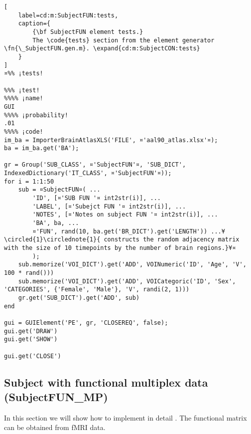 \documentclass{tufte-handout}
\begin{document}
\clearpage
\begin{lstlisting}[
	label=cd:m:SubjectFUN:tests,
	caption={
		{\bf SubjectFUN element tests.}
		The \code{tests} section from the element generator \fn{\_SubjectFUN.gen.m}. \expand{cd:m:SubjectCON:tests}
	}
]
¤%% ¡tests!

%%% ¡test!
%%%% ¡name!
GUI
%%%% ¡probability!
.01
%%%% ¡code!
im_ba = ImporterBrainAtlasXLS('FILE', ¤'aal90_atlas.xlsx'¤);
ba = im_ba.get('BA');

gr = Group('SUB_CLASS', ¤'SubjectFUN'¤, 'SUB_DICT', IndexedDictionary('IT_CLASS', ¤'SubjectFUN'¤));
for i = 1:1:50
    sub = ¤SubjectFUN¤( ...
        'ID', [¤'SUB FUN '¤ int2str(i)], ...
        'LABEL', [¤'Subejct FUN '¤ int2str(i)], ...
        'NOTES', [¤'Notes on subject FUN '¤ int2str(i)], ...
        'BA', ba, ...
        ¤'FUN', rand(10, ba.get('BR_DICT').get('LENGTH')) ...¥\circled{1}\circlednote{1}{ constructs the random adjacency matrix with the size of 10 timepoints by the number of brain regions.}¥¤
        );
    sub.memorize('VOI_DICT').get('ADD', VOINumeric('ID', 'Age', 'V', 100 * rand()))
    sub.memorize('VOI_DICT').get('ADD', VOICategoric('ID', 'Sex', 'CATEGORIES', {'Female', 'Male'}, 'V', randi(2, 1)))
    gr.get('SUB_DICT').get('ADD', sub)
end

gui = GUIElement('PE', gr, 'CLOSEREQ', false);
gui.get('DRAW')
gui.get('SHOW')

gui.get('CLOSE')
\end{lstlisting}

\clearpage

\subsection{Subject with functional multiplex data (SubjectFUN\_MP)}

In this section we will show how to implement in detail . The functional matrix can be obtained from fMRI data.
\end{document}
